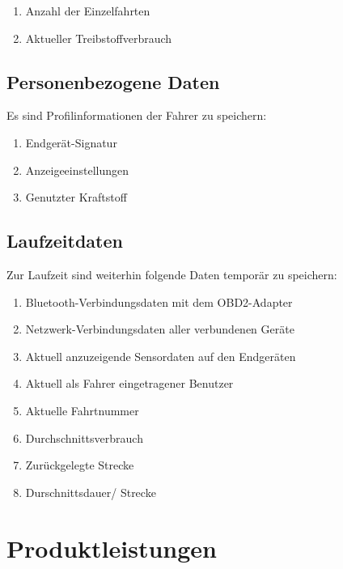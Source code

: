 \documentclass[pflichtenheft.tex]{subfiles}
\begin{document}
\begin{enumerate}
\setcounter{enumi}{\value{enumTemp}}
\item Anzahl der Einzelfahrten
\item Aktueller Treibstoffverbrauch
\setcounter{enumTemp}{\value{enumi}}
\end{enumerate}

\section{\mkd Personenbezogene Daten}
Es sind Profilinformationen der Fahrer zu speichern:

\begin{enumerate}
\setcounter{enumi}{\value{enumTemp}}
\item Endgerät-Signatur
\item Anzeigeeinstellungen
\item Genutzter Kraftstoff
\setcounter{enumTemp}{\value{enumi}}
\end{enumerate}

\section{\mkd Laufzeitdaten}
Zur Laufzeit sind weiterhin folgende Daten temporär zu speichern:
\begin{enumerate}
\setcounter{enumi}{\value{enumTemp}}
\item Bluetooth-Verbindungsdaten mit dem OBD2-Adapter
\item Netzwerk-Verbindungsdaten aller verbundenen Geräte
\item Aktuell anzuzeigende Sensordaten auf den Endgeräten
\item Aktuell als Fahrer eingetragener Benutzer
\item Aktuelle Fahrtnummer
\item Durchschnittsverbrauch
\item Zurückgelegte Strecke
\item Durschnittsdauer/ Strecke
\setcounter{enumTemp}{\value{enumi}}
\end{enumerate}

\chapter{Produktleistungen}

\renewcommand{\theenumi}{/PL\ifnum \value{enumi}<10 0\fi\arabic{enumi}0/}
\renewcommand{\labelenumi}{\theenumi}
\renewcommand{\theenumii}{\arabic{enumii}}
\renewcommand{\labelenumii}{PL\ifnum \value{enumi}<10 0\fi\arabic{enumi}\arabic{enumii}/}
\end{document}
